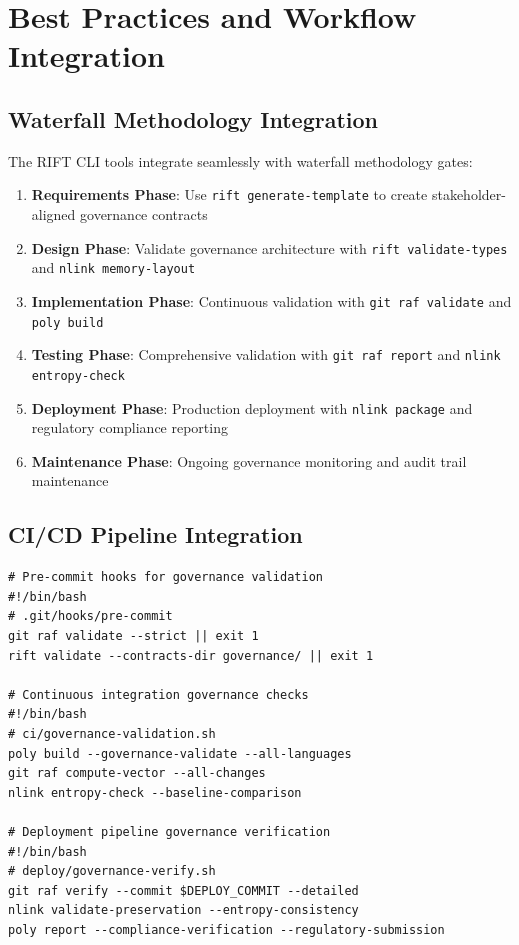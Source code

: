 \documentclass[11pt,letterpaper]{article}
\begin{document}
\section{Best Practices and Workflow Integration}

\subsection{Waterfall Methodology Integration}

The RIFT CLI tools integrate seamlessly with waterfall methodology gates:

\begin{enumerate}
\item \textbf{Requirements Phase}: Use \texttt{rift generate-template} to create stakeholder-aligned governance contracts
\item \textbf{Design Phase}: Validate governance architecture with \texttt{rift validate-types} and \texttt{nlink memory-layout}
\item \textbf{Implementation Phase}: Continuous validation with \texttt{git raf validate} and \texttt{poly build}
\item \textbf{Testing Phase}: Comprehensive validation with \texttt{git raf report} and \texttt{nlink entropy-check}
\item \textbf{Deployment Phase}: Production deployment with \texttt{nlink package} and regulatory compliance reporting
\item \textbf{Maintenance Phase}: Ongoing governance monitoring and audit trail maintenance
\end{enumerate}

\subsection{CI/CD Pipeline Integration}

\begin{lstlisting}[language=shell, caption=CI/CD Pipeline Integration Examples]
# Pre-commit hooks for governance validation
#!/bin/bash
# .git/hooks/pre-commit
git raf validate --strict || exit 1
rift validate --contracts-dir governance/ || exit 1

# Continuous integration governance checks
#!/bin/bash
# ci/governance-validation.sh
poly build --governance-validate --all-languages
git raf compute-vector --all-changes
nlink entropy-check --baseline-comparison

# Deployment pipeline governance verification
#!/bin/bash
# deploy/governance-verify.sh
git raf verify --commit $DEPLOY_COMMIT --detailed
nlink validate-preservation --entropy-consistency
poly report --compliance-verification --regulatory-submission
\end{lstlisting}
\end{document}
